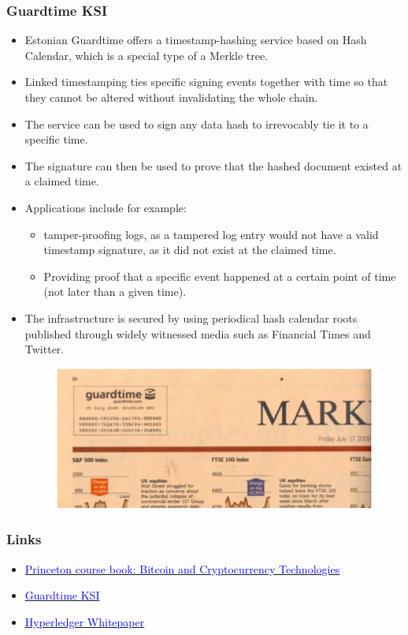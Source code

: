 \documentclass[8pt]{beamer}
\begin{document}
\begin{frame}
\frametitle{Guardtime KSI}
\begin{itemize}
 \item Estonian Guardtime offers a timestamp-hashing service based on Hash Calendar, which is a special type of a Merkle tree.
 \item Linked timestamping ties specific signing events together with time so that they cannot be altered without invalidating the whole chain.
 \item The service can be used to sign any data hash to irrevocably tie it to a specific time.
 \item The signature can then be used to prove that the hashed document existed at a claimed time.
 \item Applications include for example:
 \begin{itemize}
   \item tamper-proofing logs, as a tampered log entry would not have a valid timestamp signature, as it did not exist at the claimed time.
   \item Providing proof that a specific event happened at a certain point of time (not later than a given time).
 \end{itemize}
 \item The infrastructure is secured by using periodical hash calendar roots published through widely witnessed media such as Financial Times and Twitter.
\begin{figure}[tb]
 \centering
 \includegraphics[width=3 cm,keepaspectratio=true]{./blockchain_images/widely_witnessed_media.png}
\end{figure}
\end{itemize}

\end{frame}

\begin{frame}
\frametitle{Links}
\begin{itemize}
 \item \href{https://d28rh4a8wq0iu5.cloudfront.net/bitcointech/readings/princeton\_bitcoin\_book.pdf?a=1}{\textcolor{blue}{Princeton course book: Bitcoin and Cryptocurrency Technologies}}
 \item \href{https://guardtime.com/technology/ksi-technology}{\textcolor{blue}{Guardtime KSI}}
 \item \href{http://www.the-blockchain.com/docs/Hyperledger\%20Whitepaper.pdf}{\textcolor{blue}{Hyperledger Whitepaper}}
\end{itemize}
\end{frame}
\end{document}
